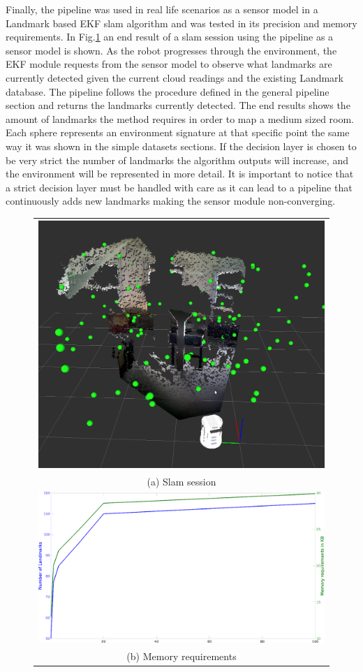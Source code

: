 \documentclass[]{article}
\begin{document}
    Finally, the pipeline was used in real life scenarios as a sensor model in a Landmark based EKF slam algorithm and was tested in its precision and memory requirements. In Fig.\ref{slam} an end result of a slam session using the pipeline as a sensor model is shown. As the robot progresses through the environment, the EKF module requests from the sensor model to observe what landmarks are currently detected given the current cloud readings and the existing Landmark database. The pipeline follows the procedure defined in the general pipeline section and returns the landmarks currently detected. The end results shows the amount of landmarks the method requires in order to map a medium sized room. Each sphere represents an environment signature at that specific point the same way it was shown in the simple datasets sections. If the decision layer is chosen to be very strict the number of landmarks the algorithm outputs will increase, and the environment will be represented in more detail. It is important to notice that a strict decision layer must be handled with care as it can lead to a pipeline that continuously adds new landmarks making the sensor module non-converging.


    \begin{figure}
        \begin{tabular}{c}
            \includegraphics[width=.353\textwidth]{slam110landmarks2} \\
            (a) Slam session \\
            \includegraphics[width=.353\textwidth]{memoryRequirements} \\
            (b) Memory requirements \\[6pt]
        \end{tabular}
        \label{slam}
    \end{figure}
\end{document}

